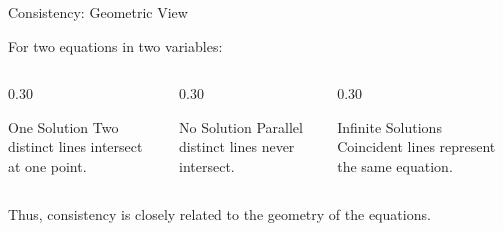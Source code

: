 \begin{frame}{Consistency: Geometric View}

For two equations in two variables:

\vspace{0.3cm}

\begin{columns}[T,totalwidth=\textwidth]

\begin{column}{0.30\textwidth}

\begin{block}{One Solution}
Two distinct lines intersect at one point.
\end{block}

\end{column}

\begin{column}{0.30\textwidth}

\begin{block}{No Solution}
Parallel distinct lines never intersect.
\end{block}

\end{column}

\begin{column}{0.30\textwidth}

\begin{block}{Infinite Solutions}
Coincident lines represent the same equation.
\end{block}

\end{column}

\end{columns}

\vspace{0.5cm}

Thus, consistency is closely related to the geometry of the
equations.

\end{frame}



